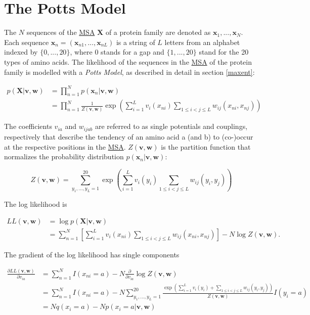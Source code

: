 \documentclass[11pt,a4paper,twoside]{book}
\newcommand{\eq}{\!=\!}
\newcommand{\LL}{L\!L(\mathbf{v}, \mathbf{w})}
\newcommand{\seq}{\mathbf{x}}
\renewcommand{\v}{\mathbf{v}}
\newcommand{\via}{v_{ia}}
\newcommand{\w}{\mathbf{w}}
\newcommand{\wijab}{w_{ijab}}
\newcommand{\X}{\mathbf{X}}
\theoremstyle{definition}
\theoremstyle{definition}
\theoremstyle{remark}
\begin{document}
\section{The Potts Model}\label{potts-full-likelihood}

The \(N\) sequences of the \protect\hyperlink{abbrev}{MSA} \(\X\) of a
protein family are denoted as \({\seq_1, ..., \seq_N}\). Each sequence
\(\seq_n = (\seq_{n1}, ..., \seq_{nL})\) is a string of \(L\) letters
from an alphabet indexed by \(\{0, ..., 20\}\), where 0 stands for a gap
and \(\{1, ... , 20\}\) stand for the 20 types of amino acids. The
likelihood of the sequences in the \protect\hyperlink{abbrev}{MSA} of
the protein family is modelled with a \emph{Potts Model}, as described
in detail in section \ref{maxent}:

\begin{align}
    p(\X | \v, \w) &= \prod_{n=1}^N p(\seq_n | \v, \w) \nonumber \\
                   &= \prod_{n=1}^N \frac{1}{Z(\v, \w)} \exp \left( \sum_{i=1}^L v_i(x_{ni}) \sum_{1 \leq i < j \leq L} w_{ij}(x_{ni}, x_{nj}) \right)
\end{align}

The coefficients \(\via\) and \(\wijab\) are referred to as single
potentials and couplings, respectively that describe the tendency of an
amino acid a (and b) to (co-)occur at the respective positions in the
\protect\hyperlink{abbrev}{MSA}. \(Z(\v, \w)\) is the partition function
that normalizes the probability distribution \(p(\seq_n |\v, \w)\):

\begin{equation}
  Z(\v, \w) = \sum_{y_1, ..., y_L = 1}^{20} \exp \left( \sum_{i=1}^L v_i(y_i) \sum_{1 \leq i < j \leq L} w_{ij}(y_i, y_j)  \right)
\end{equation}

The log likelihood is

\begin{align}
    \LL &= \log p(\X | \v, \w) \nonumber \\
        &= \sum_{n=1}^N \left [  \sum_{i=1}^L v_i(x_{ni}) \sum_{1 \leq i < j \leq L} w_{ij}(x_{ni}, x_{nj})   \right ] - N \log Z(\v, \w) .
\end{align}

The gradient of the log likelihood has single components

\begin{align}
    \frac{\partial \LL}{\partial \via} &= \sum_{n=1}^N I(x_{ni} \eq a)  - N \frac{\partial}{\partial \via} \log Z(\v,\w) \nonumber\\
                                        &= \sum_{n=1}^N I(x_{ni} \eq a) - N \sum_{y_1,\ldots,y_L=1}^{20} \!\! \frac{ \exp \left( \sum_{i=1}^L v_i(y_i) + \sum_{1 \le i < j \le L} w_{ij}(y_i,y_j) \right)}{Z(\v,\w)}  I(y_i \eq a) \nonumber\\
                                        &=  N q(x_{i} \eq a) - N p(x_i \eq a | \v,\w) 
\label{eq:gradient-LL-single}
\end{align}
\end{document}
